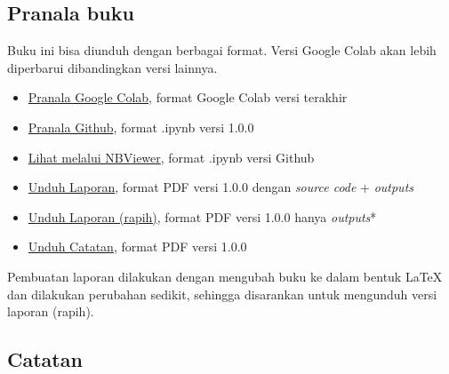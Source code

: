 \documentclass[11pt]{article}
\providecommand{\tightlist}{%
      \setlength{\itemsep}{0pt}\setlength{\parskip}{0pt}}
\begin{document}
\hypertarget{pranala-buku}{%
\subsection{Pranala buku}\label{pranala-buku}}

Buku ini bisa diunduh dengan berbagai format. Versi Google Colab akan
lebih diperbarui dibandingkan versi lainnya.

\begin{itemize}
\tightlist
\item
  \href{https://colab.research.google.com/drive/1bx3ak_20dcJ7VdGR-djysLIxLaX7pRI2}{Pranala
  Google Colab}, format Google Colab versi terakhir
\item
  \href{https://github.com/taruma/vivaldi/blob/master/notebook/github_taruma_demo_lstm_rr.ipynb}{Pranala
  Github}, format .ipynb versi 1.0.0
\item
  \href{https://nbviewer.jupyter.org/github/taruma/vivaldi/blob/master/notebook/github_taruma_demo_lstm_rr.ipynb}{Lihat
  melalui NBViewer}, format .ipynb versi Github
\item
  \href{https://github.com/taruma/vivaldi/blob/master/pdf/taruma_lstm_rr_laporan.pdf?raw=true}{Unduh
  Laporan}, format PDF versi 1.0.0 dengan \emph{source code} +
  \emph{outputs}
\item
  \href{https://github.com/taruma/vivaldi/blob/master/pdf/taruma_lstm_rr_laporan_rapih.pdf?raw=true}{Unduh
  Laporan (rapih)}, format PDF versi 1.0.0 hanya \emph{outputs}*
\item
  \href{https://github.com/taruma/vivaldi/blob/master/pdf/taruma_lstm_rr_catatan.pdf?raw=true}{Unduh
  Catatan}, format PDF versi 1.0.0
\end{itemize}

Pembuatan laporan dilakukan dengan mengubah buku ke dalam bentuk LaTeX
dan dilakukan perubahan sedikit, sehingga disarankan untuk mengunduh
versi laporan (rapih).

\hypertarget{catatan}{%
\subsection{Catatan}\label{catatan}}
\end{document}
